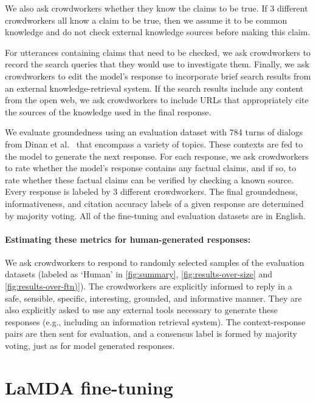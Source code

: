 We also ask crowdworkers whether they know the claims to be true. If 3 different crowdworkers all know a claim to be true, then we assume it to be common knowledge and do not check external knowledge sources before making this claim.

For utterances containing claims that need to be checked, we ask crowdworkers to record the search queries that they would use to investigate them. Finally, we ask crowdworkers to edit the model’s response to incorporate brief search results from an external knowledge-retrieval system. If the search results include any content from the open web, we ask crowdworkers to include URLs that appropriately cite the sources of the knowledge used in the final response.

We evaluate groundedness using an evaluation dataset with 784 turns of dialogs from Dinan et al.~\cite{Dinan2019WizardOW} that encompass a variety of topics. These contexts are fed to the model to generate the next response. For each response, we ask crowdworkers to rate whether the model’s response contains any factual claims, and if so, to rate whether these factual claims can be verified by checking a known source. Every response is labeled by 3 different crowdworkers. The final groundedness, informativeness, and citation accuracy labels of a given response are determined by majority voting. All of the fine-tuning and evaluation datasets are in English.

\paragraph{Estimating these metrics for human-generated responses:} We ask crowdworkers to respond to randomly selected samples of the evaluation datasets (labeled as `Human' in \ref{fig:summary}, \ref{fig:results-over-size} and \ref{fig:results-over-ftn)}). The crowdworkers are explicitly informed to reply in a safe, sensible, specific, interesting, grounded, and informative manner. They are also explicitly asked to use any external tools necessary to generate these responses (e.g., including an information retrieval system). The context-response pairs are then sent for evaluation, and a consensus label is formed by majority voting, just as for model generated responses.

\section{LaMDA fine-tuning}
\label{sec:method}

